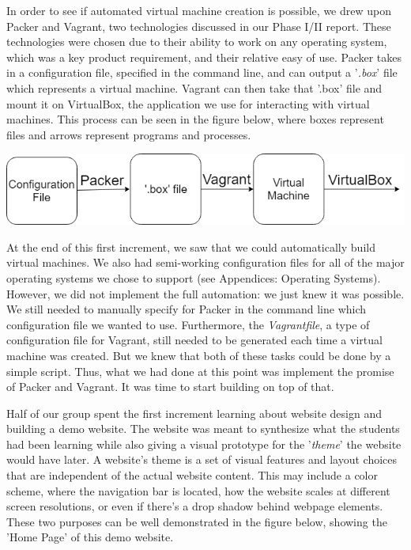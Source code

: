 \documentclass[openright]{report}
\begin{document}
\par In order to see if automated virtual machine creation is possible, we drew upon Packer and Vagrant, two technologies discussed in our Phase I/II report. These technologies were chosen due to their ability to work on any operating system, which was a key product requirement, and their relative easy of use. Packer takes in a configuration file, specified in the command line, and can output a '\textit{.box}' file which represents a virtual machine. Vagrant can then take that '.box' file and mount it on VirtualBox, the application we use for interacting with virtual machines. This process can be seen in the figure below, where boxes represent files and arrows represent programs and processes.

\begin{center}
    \includegraphics[scale=0.64]{images/Proto1.png}
\end{center}

\par At the end of this first increment, we saw that we could automatically build virtual machines. We also had semi-working configuration files for all of the major operating systems we chose to support (see Appendices: Operating Systems). However, we did not implement the full automation: we just knew it was possible. We still needed to manually specify for Packer in the command line which configuration file we wanted to use. Furthermore, the \textit{Vagrantfile}, a type of configuration file for Vagrant, still needed to be generated each time a virtual machine was created. But we knew that both of these tasks could be done by a simple script. Thus, what we had done at this point was implement the promise of Packer and Vagrant. It was time to start building on top of that.

\par Half of our group spent the first increment learning about website design and building a demo website. The website was meant to synthesize what the students had been learning while also giving a visual prototype for the '\textit{theme}' the website would have later. A website's theme is a set of visual features and layout choices that are independent of the actual website content. This may include a color scheme, where the navigation bar is located, how the website scales at different screen resolutions, or even if there's a drop shadow behind webpage elements. These two purposes can be well demonstrated in the figure below, showing the 'Home Page' of this demo website.
\end{document}
